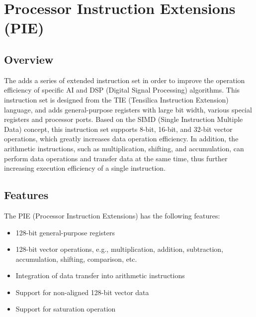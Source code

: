 \documentclass[main\_\_EN.tex]{subfiles}
\begin{document}

\ifglobal
\else
    {\let\clearpage\relax \listoftodos}
    \tableofcontents
\fi











\hypertarget{pie}{}
\chapter{Processor Instruction Extensions (PIE)}
\label{mod:pie}


\section{Overview}

The \chipname{} adds a series of extended instruction set in order to improve the operation efficiency of specific AI and DSP (Digital Signal Processing) algorithms. This instruction set is designed from the TIE (Tensilica Instruction Extension) language, and adds general-purpose registers with large bit width, various special registers and processor ports. Based on the SIMD (Single Instruction Multiple Data) concept, this instruction set supports 8-bit, 16-bit, and 32-bit vector operations, which greatly increases data operation efficiency. In addition, the arithmetic instructions, such as multiplication, shifting, and accumulation, can perform data operations and transfer data at the same time, thus further increasing execution efficiency of a single instruction.




\section{Features}

The PIE (Processor Instruction Extensions) has the following features:

\begin{itemize}
    \item 128-bit general-purpose registers
    \item 128-bit vector operations, e.g., multiplication, addition, subtraction, accumulation, shifting, comparison, etc.
    \item Integration of data transfer into arithmetic instructions
    \item Support for non-aligned 128-bit vector data
    \item Support for saturation operation

\end{itemize}
\end{document}

